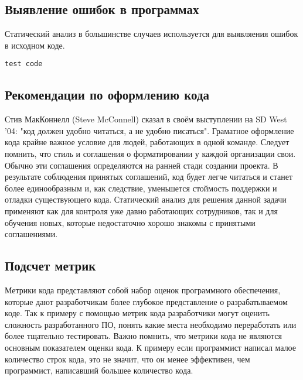 \subsection {Выявление ошибок в программах}
Статический анализ в большинстве случаев используется для выявляения ошибок в исходном коде.
\begin{lstlisting}
test code
\end{lstlisting}
 

\subsection {Рекомендации по оформлению кода}
Стив МакКоннелл (Steve McConnell) сказал в своём выступлении на SD West '04: "код должен удобно 
читаться, а не удобно писаться". Граматное оформление кода крайне важное условие для людей, работающих
в одной команде. Следует помнить, что стиль и соглашения о форматировании 
у каждой организации свои. Обычно эти соглашения определяются на ранней стади создании проекта.
В результате соблюдения принятых соглашений, код будет легче читаться и станет более единообразным 
и, как следствие, уменьшется стоймость поддержки и отладки существующего кода.  
Статический анализ для решения данной задачи применяют как для контроля уже давно работающих сотрудников,
так и для обучения новых, которые недостаточно хорошо знакомы с принятыми соглашениями.

\subsection {Подсчет метрик}
Метрики кода представляют собой набор оценок программного обеспечения, которые дают разработчикам 
более глубокое представление о разрабатываемом коде.
Так к примеру с помощью метрик кода разработчики могут оценить сложность разработанного ПО,
понять какие места необходимо переработать или более тщательно тестировать. Важно помнить, что метрики
кода не являются основным показателем оценки кода. К примеру если программист написал малое 
количество строк кода, это не значит, что он менее эффективен, чем программист, написавший большее количество кода.

